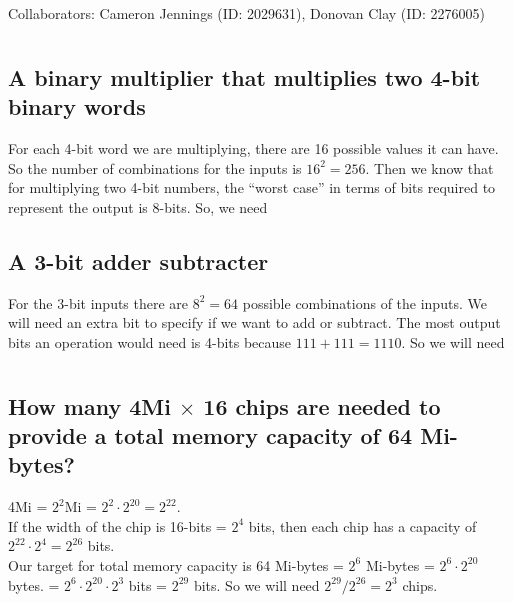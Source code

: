 \documentclass[12pt]{article}
\newcommand{\collaborators}{Cameron Jennings (ID: 2029631), Donovan Clay (ID: 2276005)}
\newcommand{\listcollaborators}{Collaborators: \collaborators}
\renewcommand*{\thesection}{Question \arabic{section}.}
\newenvironment{subquestion}[1]{\subsection{#1}
\begin{tcolorbox}[colback=blue!2!white,colframe=blue!20!white]}{\end{tcolorbox}}
\begin{document}
    \setcounter{tocdepth}{1}
    \begin{center}\label{beginning}
        \tableofcontents 
    \end{center}

    \begin{center}
        \listcollaborators
    \end{center}

    \titleformat{\section}{\normalfont\fontsize{17.28}{15}\bfseries\raggedright}{\thesection}{1em}{}
    \newpage

    \section{}

        \begin{subquestion}{A binary multiplier that multiplies two 4-bit binary words}
            For each 4-bit word we are multiplying, there are 16 possible values it can have. So the number of combinations for the inputs is $16^2 = 256$. Then we know that for multiplying two 4-bit numbers, the ``worst case'' in terms of bits required to represent the output is 8-bits. So, we need 
        \end{subquestion}    

        \begin{subquestion}{A 3-bit adder subtracter}
            For the 3-bit inputs there are $8^2 = 64$ possible combinations of the inputs. We will need an extra bit to specify if we want to add or subtract. The most output bits an operation would need is 4-bits because $111 + 111 = 1110$. So we will need 
        \end{subquestion}

    \section{}
        \begin{subquestion}{How many 4Mi $\times$ 16 chips are needed to provide a total memory capacity of 64 Mi-bytes?}
            4Mi = $2^2$Mi = $2^2 \cdot 2^{20} = 2^{22}$.\\
            If the width of the chip is 16-bits = $2^4$ bits, then each chip has a capacity of $2^{22} \cdot 2^4 = 2^{26}$ bits. \\
            Our target for total memory capacity is 64 Mi-bytes = $2^6$ Mi-bytes = $2^6 \cdot 2^{20}$ bytes. = $2^6 \cdot 2^{20} \cdot 2^{3}$ bits = $2^{29}$ bits. So we will need $2^{29}/2^{26} = 2^{3}$ chips. \\
        \end{subquestion}
\end{document}
